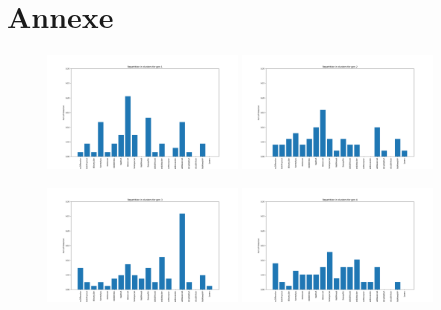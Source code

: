 \documentclass[a4paper,12pt]{article}
\begin{document}
\section{Annexe}

\begin{figure}[!h]
    \centering

    \includegraphics[width=0.45\textwidth]{Clustering/number_poke_gen/gen1.png}
    \includegraphics[width=0.45\textwidth]{Clustering/number_poke_gen/gen2.png}
    

    \vspace{1em}  %

    \includegraphics[width=0.45\textwidth]{Clustering/number_poke_gen/gen3.png}
    \includegraphics[width=0.45\textwidth]{Clustering/number_poke_gen/gen4.png}
    

    \vspace{1em}  %


\end{figure}
\end{document}
